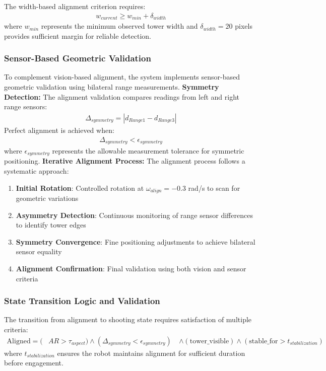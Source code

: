 The width-based alignment criterion requires:
\begin{align}
w_{current} \geq w_{min} + \delta_{width}
\end{align}
where $w_{min}$ represents the minimum observed tower width and $\delta_{width} = 20$ pixels provides sufficient margin for reliable detection.
\subsubsection{Sensor-Based Geometric Validation}
To complement vision-based alignment, the system implements sensor-based geometric validation using bilateral range measurements.
\textbf{Symmetry Detection:}
The alignment validation compares readings from left and right range sensors:
\begin{align}
\Delta_{symmetry} = |d_{Range1} - d_{Range3}|
\end{align}
Perfect alignment is achieved when:
\begin{align}
\Delta_{symmetry} < \epsilon_{symmetry}
\end{align}
where $\epsilon_{symmetry}$ represents the allowable measurement tolerance for symmetric positioning.
\textbf{Iterative Alignment Process:}
The alignment process follows a systematic approach:
\begin{enumerate}
\item \textbf{Initial Rotation}: Controlled rotation at $\omega_{align} = -0.3$ rad/s to scan for geometric variations
\item \textbf{Asymmetry Detection}: Continuous monitoring of range sensor differences to identify tower edges
\item \textbf{Symmetry Convergence}: Fine positioning adjustments to achieve bilateral sensor equality
\item \textbf{Alignment Confirmation}: Final validation using both vision and sensor criteria
\end{enumerate}
\subsubsection{State Transition Logic and Validation}
The transition from alignment to shooting state requires satisfaction of multiple criteria:
\begin{align}
\text{Aligned} = (&AR > \tau_{aspect}) \land (\Delta_{symmetry} < \epsilon_{symmetry}) \
&\land (\text{tower\_visible}) \land (\text{stable\_for} > t_{stabilization})
\end{align}
where $t_{stabilization}$ ensures the robot maintains alignment for sufficient duration before engagement.
